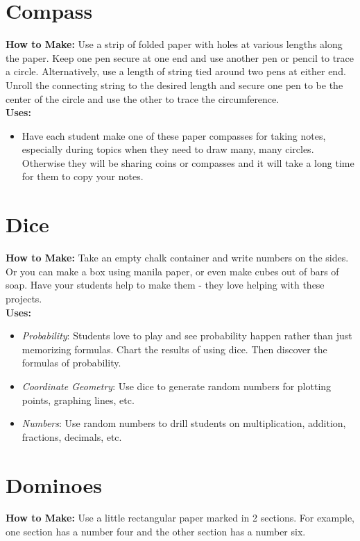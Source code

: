 \section{Compass} \label{compass}
\textbf{How to Make:} Use a strip of folded paper with holes at various lengths along the paper. Keep one pen secure at one end and use another pen or pencil to trace a circle. Alternatively, use a length of string tied around two pens at either end. Unroll the connecting string to the desired length and secure one pen to be the center of the circle and use the other to trace the circumference.\\

\noindent\textbf{Uses:}
\begin{itemize}
\item Have each student make one of these paper compasses for taking notes, especially during topics when they need to draw many, many circles. Otherwise they will be sharing coins or compasses and it will take a long time for them to copy your notes.
\end{itemize}

\section{Dice} \label{dice}
\textbf{How to Make:} Take an empty chalk container and write numbers on the sides. Or you can make a box using manila paper, or even make cubes out of bars of soap. Have your students help to make them - they love helping with these projects.\\

\noindent\textbf{Uses:}
\begin{itemize}
\item \emph{Probability}: Students love to play and see probability happen rather than just memorizing formulas. Chart the results of using dice. Then discover the formulas of probability.
\item \emph{Coordinate Geometry}: Use dice to generate random numbers for plotting points, graphing lines, etc.
\item \emph{Numbers}: Use random numbers to drill students on multiplication, addition, fractions, decimals, etc.
\end{itemize}

\section{Dominoes} \label{dominoes}
\textbf{How to Make:} Use a little rectangular paper marked in 2 sections. For example, one section has a number four and the other section has a number six.\\

